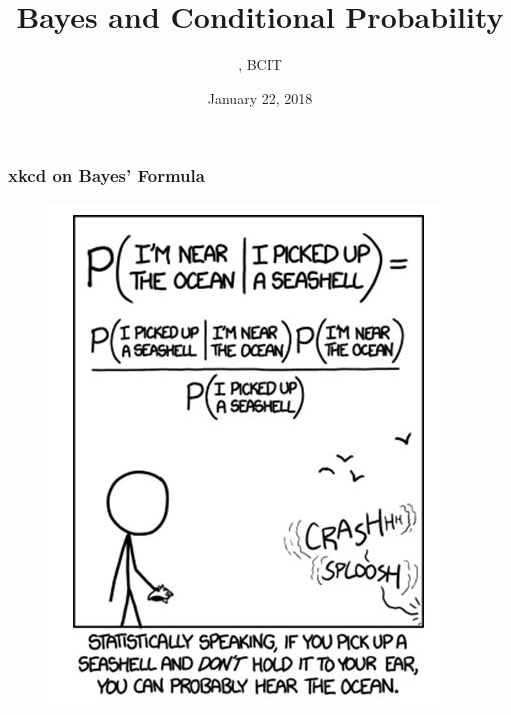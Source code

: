 \documentclass[xcolor=dvipsnames]{beamer}
\title{Bayes and Conditional Probability}
\subtitle{{\CourseNumber}, BCIT}
\author{\CourseName}
\date{January 22, 2018}
\begin{document}
\begin{frame}
  \titlepage
\end{frame}

\begin{frame}
  \frametitle{xkcd on Bayes' Formula}
\begin{figure}[h]
\includegraphics[scale=.5]{./diagrams/xkcd_bayes1.png}
\end{figure}
\end{frame}
\end{document}
